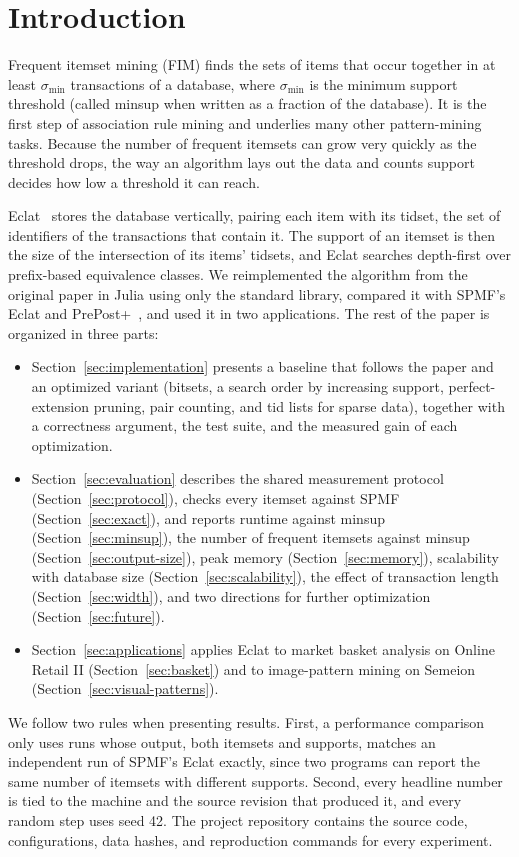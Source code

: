 \section{Introduction}
Frequent itemset mining (FIM) finds the sets of items that occur together in at least
$\sigma_{\min}$ transactions of a database, where $\sigma_{\min}$ is the minimum support
threshold (called minsup when written as a fraction of the database). It is the first
step of association rule mining and underlies many other pattern-mining tasks. Because
the number of frequent itemsets can grow very quickly as the threshold drops, the way an
algorithm lays out the data and counts support decides how low a threshold it can reach.

Eclat~\cite{zaki2000} stores the database vertically, pairing each item with its tidset,
the set of identifiers of the transactions that contain it. The support of an itemset is
then the size of the intersection of its items' tidsets, and Eclat searches depth-first
over prefix-based equivalence classes. We reimplemented the algorithm from the original
paper in Julia using only the standard library, compared it with SPMF's Eclat and
PrePost+~\cite{spmf2016}, and used it in two applications. The rest of the paper is
organized in three parts:
\begin{itemize}
\item Section~\ref{sec:implementation} presents a baseline that follows the paper and an
optimized variant (bitsets, a search order by increasing support, perfect-extension
pruning, pair counting, and tid lists for sparse data), together with a correctness
argument, the test suite, and the measured gain of each optimization.
\item Section~\ref{sec:evaluation} describes the shared measurement protocol
(Section~\ref{sec:protocol}), checks every itemset against SPMF
(Section~\ref{sec:exact}), and reports runtime against minsup
(Section~\ref{sec:minsup}), the number of frequent itemsets against minsup
(Section~\ref{sec:output-size}), peak memory (Section~\ref{sec:memory}), scalability
with database size (Section~\ref{sec:scalability}), the effect of transaction length
(Section~\ref{sec:width}), and two directions for further optimization
(Section~\ref{sec:future}).
\item Section~\ref{sec:applications} applies Eclat to market basket analysis on Online
Retail II (Section~\ref{sec:basket}) and to image-pattern mining on Semeion
(Section~\ref{sec:visual-patterns}).
\end{itemize}

We follow two rules when presenting results. First, a performance comparison only uses
runs whose output, both itemsets and supports, matches an independent run of SPMF's
Eclat exactly, since two programs can report the same number of itemsets with different
supports. Second, every headline number is tied to the machine and the source revision
that produced it, and every random step uses seed 42. The project repository contains the
source code, configurations, data hashes, and reproduction commands for every experiment.
